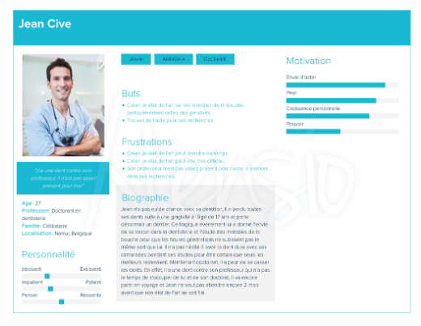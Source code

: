 \documentclass[t, 12pt, usenames,dvipsnames]{article}
\begin{document}
                 \begin{center}
                    \includegraphics[scale=.2]{images/sprint/personna-jean-cive.png}
                    \label{fig:sprint1_personna}


\end{center}
\end{document}
